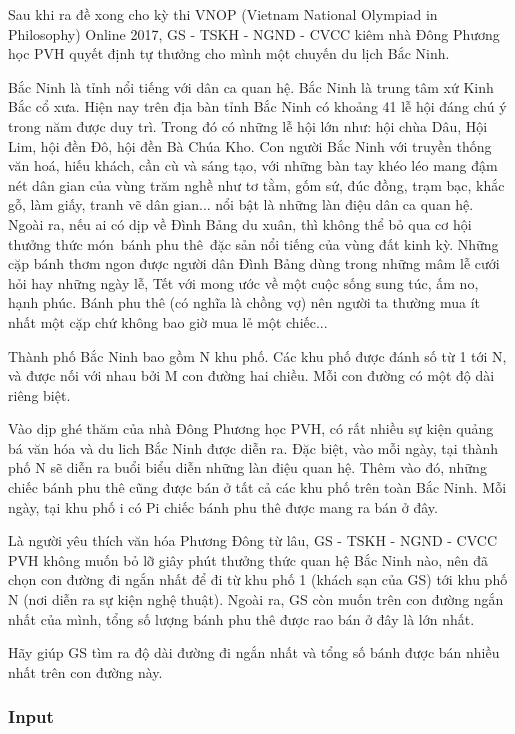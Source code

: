 

Sau khi ra đề xong cho kỳ thi VNOP (Vietnam National Olympiad in Philosophy) Online 2017, GS - TSKH - NGND - CVCC kiêm nhà Đông Phương học PVH quyết định tự thưởng cho mình một chuyến du lịch Bắc Ninh.

Bắc Ninh là tỉnh nổi tiếng với dân ca quan hệ. Bắc Ninh là trung tâm xứ Kinh Bắc cổ xưa. Hiện nay trên địa bàn tỉnh Bắc Ninh có khoảng 41 lễ hội đáng chú ý trong năm được duy trì. Trong đó có những lễ hội lớn như: hội chùa Dâu, Hội Lim, hội đền Đô, hội đền Bà Chúa Kho. Con người Bắc Ninh với truyền thống văn hoá, hiếu khách, cần cù và sáng tạo, với những bàn tay khéo léo mang đậm nét dân gian của vùng trăm nghề như tơ tằm, gốm sứ, đúc đồng, trạm bạc, khắc gỗ, làm giấy, tranh vẽ dân gian... nổi bật là những làn điệu dân ca quan hệ. Ngoài ra, nếu ai có dịp về Đình Bảng du xuân, thì không thể bỏ qua cơ hội thưởng thức món bánh phu thê đặc sản nổi tiếng của vùng đất kinh kỳ. Những cặp bánh thơm ngon được người dân Đình Bảng dùng trong những mâm lễ cưới hỏi hay những ngày lễ, Tết với mong ước về một cuộc sống sung túc, ấm no, hạnh phúc. Bánh phu thê (có nghĩa là chồng vợ) nên người ta thường mua ít nhất một cặp chứ không bao giờ mua lẻ một chiếc...

Thành phố Bắc Ninh bao gồm N khu phố. Các khu phố được đánh số từ 1 tới N, và được nối với nhau bởi M con đường hai chiều. Mỗi con đường có một độ dài riêng biệt.

Vào dịp ghé thăm của nhà Đông Phương học PVH, có rất nhiều sự kiện quảng bá văn hóa và du lich Bắc Ninh được diễn ra. Đặc biệt, vào mỗi ngày, tại thành phố N sẽ diễn ra buổi biểu diễn những làn điệu quan hệ. Thêm vào đó, những chiếc bánh phu thê cũng được bán ở tất cả các khu phố trên toàn Bắc Ninh. Mỗi ngày, tại khu phố i có Pi chiếc bánh phu thê được mang ra bán ở đây.

Là người yêu thích văn hóa Phương Đông từ lâu, GS - TSKH - NGND - CVCC PVH không muốn bỏ lỡ giây phút thưởng thức quan hệ Bắc Ninh nào, nên đã chọn con đường đi ngắn nhất để đi từ khu phố 1 (khách sạn của GS) tới khu phố N (nơi diễn ra sự kiện nghệ thuật). Ngoài ra, GS còn muốn trên con đường ngắn nhất của mình, tổng số lượng bánh phu thê được rao bán ở đây là lớn nhất.

Hãy giúp GS tìm ra độ dài đường đi ngắn nhất và tổng số bánh được bán nhiều nhất trên con đường này.

\subsubsection{Input}

